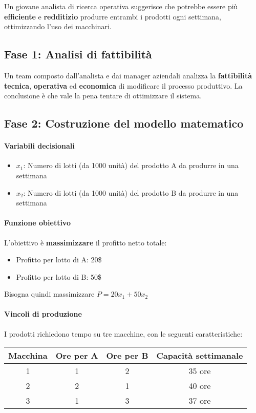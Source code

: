 Un giovane analista di ricerca operativa suggerisce che potrebbe essere più \textbf{efficiente} e \textbf{redditizio} produrre entrambi i prodotti ogni settimana, ottimizzando l'uso dei macchinari.

\subsection{Fase 1: \textbf{Analisi di fattibilità}}
Un team composto dall'analista e dai manager aziendali analizza la \textbf{fattibilità tecnica}, \textbf{operativa} ed \textbf{economica} di modificare il processo produttivo. La conclusione è che vale la pena tentare di ottimizzare il sistema.

\subsection{Fase 2: \textbf{Costruzione del modello matematico}}
\paragraph{\textbf{Variabili decisionali}}
\begin{itemize}
    \item $x_1$: Numero di lotti (da 1000 unità) del prodotto A da produrre in una settimana
    \item $x_2$: Numero di lotti (da 1000 unità) del prodotto B da produrre in una settimana
\end{itemize}

\paragraph{\textbf{Funzione obiettivo}}
L'obiettivo è \textbf{massimizzare} il profitto netto totale:
\begin{itemize}
    \item Profitto per lotto di A: 20\$
    \item Profitto per lotto di B: 50\$
\end{itemize}
Bisogna quindi massimizzare $P=20x_1+50x_2$

\paragraph{\textbf{Vincoli di produzione}}
I prodotti richiedono tempo su tre macchine, con le seguenti caratteristiche:

\begin{table}[h]
\centering
\begin{tabular}{|c|c|c|c|}
\hline
\textbf{Macchina} & \textbf{Ore per A} & \textbf{Ore per B} & \textbf{Capacità settimanale} \\
\hline
1 & 1 & 2 & 35 ore \\
\hline
2 & 2 & 1 & 40 ore \\
\hline
3 & 1 & 3 & 37 ore \\
\hline
\end{tabular}
\end{table}

